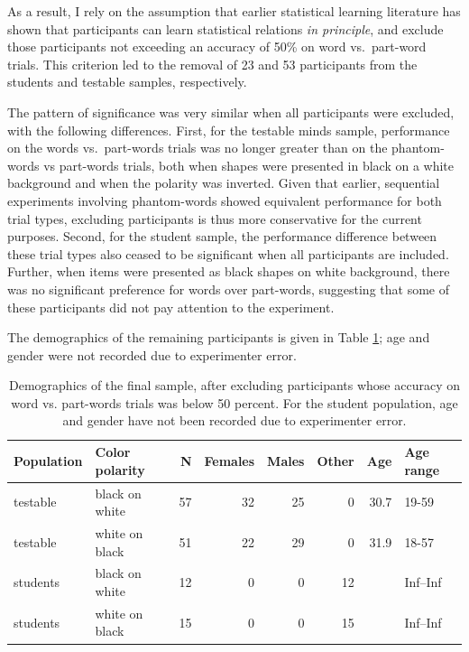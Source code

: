 \documentclass[
]{article}
\begin{document}
As a result, I rely on the assumption that earlier statistical learning
literature has shown that participants can learn statistical relations
\emph{in principle}, and exclude those participants not exceeding an
accuracy of 50\% on word vs.~part-word trials. This criterion led to the
removal of 23 and 53 participants from the students and testable
samples, respectively.

The pattern of significance was very similar when all participants were
excluded, with the following differences. First, for the testable minds
sample, performance on the words vs.~part-words trials was no longer
greater than on the phantom-words vs part-words trials, both when shapes
were presented in black on a white background and when the polarity was
inverted. Given that earlier, sequential experiments involving
phantom-words showed equivalent performance for both trial types,
excluding participants is thus more conservative for the current
purposes. Second, for the student sample, the performance difference
between these trial types also ceased to be significant when all
participants are included. Further, when items were presented as black
shapes on white background, there was no significant preference for
words over part-words, suggesting that some of these participants did
not pay attention to the experiment.

The demographics of the remaining participants is given in Table
\ref{tab:vsl-simultaneous-fa-demographics}; age and gender were not
recorded due to experimenter error.

\begin{table}

\caption{\label{tab:vsl-simultaneous-fa-demographics}Demographics of the final sample, after excluding participants whose accuracy on word vs. part-words trials was below 50 percent. For the student population, age and gender have not been recorded due to experimenter error.}
\centering
\begin{tabular}[t]{llrrrrrl}
\toprule
Population & Color polarity & N & Females & Males & Other & Age & Age range\\
\midrule
testable & black on white & 57 & 32 & 25 & 0 & 30.7 & 19-59\\
testable & white on black & 51 & 22 & 29 & 0 & 31.9 & 18-57\\
students & black on white & 12 & 0 & 0 & 12 &  & Inf--Inf\\
students & white on black & 15 & 0 & 0 & 15 &  & Inf--Inf\\
\bottomrule
\end{tabular}
\end{table}
\end{document}
